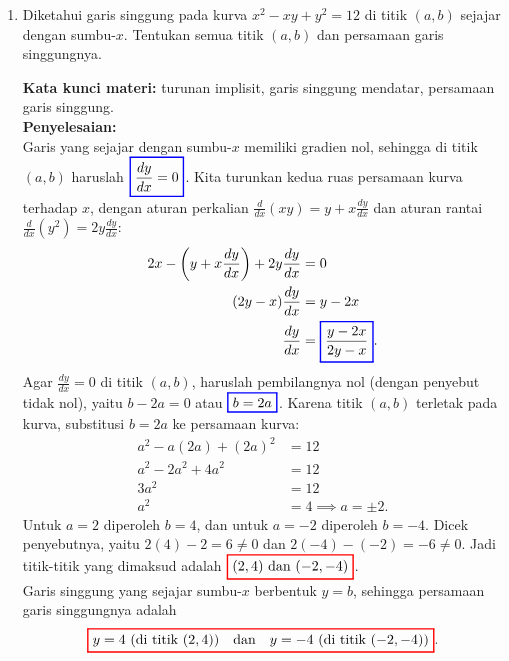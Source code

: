 \documentclass[10pt,openany,a4paper]{article}
\theoremstyle{definition}
\theoremstyle{definition}
\theoremstyle{plain}
\newenvironment{jawab}[2][tes]{%
\par\noindent\textbf{Kata kunci materi:} #1.\\
\textbf{Penyelesaian:} #2%
}{}
\begin{document}
\begin{enumerate}
    \item Diketahui garis singgung pada kurva $x^2-xy+y^2=12$ di titik $(a,b)$ sejajar dengan sumbu-$x$. Tentukan semua titik $(a,b)$ dan persamaan garis singgungnya.
    \begin{jawab}[turunan implisit, garis singgung mendatar, persamaan garis singgung]{~\\
        Garis yang sejajar dengan sumbu-$x$ memiliki gradien nol, sehingga di titik $(a,b)$ haruslah $\colorlet{oldcolor}{.}
        \color{blue}
        \setlength{\fboxrule}{1pt} \boxed{\color{oldcolor}\frac{dy}{dx}=0}\color{oldcolor}$. Kita turunkan kedua ruas persamaan kurva terhadap $x$, dengan aturan perkalian $\frac{d}{dx}(xy)=y+x\frac{dy}{dx}$ dan aturan rantai $\frac{d}{dx}(y^2)=2y\frac{dy}{dx}$:
        \begin{align*}
            2x - \left(y + x\frac{dy}{dx}\right) + 2y\frac{dy}{dx} &= 0\\
            (2y - x)\frac{dy}{dx} &= y - 2x\\
            \frac{dy}{dx} &= \colorlet{oldcolor}{.}
        \color{blue}
        \setlength{\fboxrule}{1pt} \boxed{\color{oldcolor}\frac{y-2x}{2y-x}}\color{oldcolor}.
        \end{align*}
        Agar $\frac{dy}{dx}=0$ di titik $(a,b)$, haruslah pembilangnya nol (dengan penyebut tidak nol), yaitu $b-2a=0$ atau $\colorlet{oldcolor}{.}
        \color{blue}
        \setlength{\fboxrule}{1pt} \boxed{\color{oldcolor}b=2a}\color{oldcolor}$. Karena titik $(a,b)$ terletak pada kurva, substitusi $b=2a$ ke persamaan kurva:
        \begin{align*}
            a^2 - a(2a) + (2a)^2 &= 12\\
            a^2 - 2a^2 + 4a^2 &= 12\\
            3a^2 &= 12\\
            a^2 &= 4 \implies a=\pm 2.
        \end{align*}
        Untuk $a=2$ diperoleh $b=4$, dan untuk $a=-2$ diperoleh $b=-4$. Dicek penyebutnya, yaitu $2(4)-2=6\neq 0$ dan $2(-4)-(-2)=-6\neq 0$. Jadi titik-titik yang dimaksud adalah $\colorlet{oldcolor}{.}
        \color{red}
        \setlength{\fboxrule}{1pt} \boxed{\color{oldcolor}(2,4) \text{ dan } (-2,-4)}\color{oldcolor}$.\\
        Garis singgung yang sejajar sumbu-$x$ berbentuk $y=b$, sehingga persamaan garis singgungnya adalah
        \begin{align*}
            \colorlet{oldcolor}{.}
        \color{red}
        \setlength{\fboxrule}{1pt} \boxed{\color{oldcolor}y=4 \text{ (di titik } (2,4)) \quad\text{dan}\quad y=-4 \text{ (di titik } (-2,-4))}\color{oldcolor}.
        \end{align*}
    }
    \end{jawab}
\end{enumerate}
\end{document}
